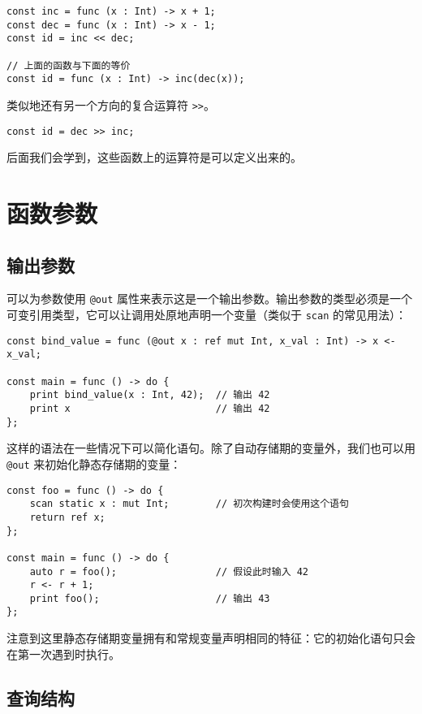 \begin{lstlisting}
const inc = func (x : Int) -> x + 1;
const dec = func (x : Int) -> x - 1;
const id = inc << dec;

// 上面的函数与下面的等价
const id = func (x : Int) -> inc(dec(x));
\end{lstlisting}

类似地还有另一个方向的复合运算符 \lstinline!>>!。

\begin{lstlisting}
const id = dec >> inc;
\end{lstlisting}

后面我们会学到，这些函数上的运算符是可以定义出来的。

\section{函数参数}

\subsection{输出参数}

可以为参数使用 \lstinline!@out! 属性来表示这是一个输出参数。输出参数的类型必须是一个可变引用类型，它可以让调用处原地声明一个变量（类似于 \lstinline!scan! 的常见用法）：

\begin{lstlisting}
const bind_value = func (@out x : ref mut Int, x_val : Int) -> x <- x_val;

const main = func () -> do {
	print bind_value(x : Int, 42);	// 输出 42
	print x							// 输出 42
};
\end{lstlisting}

这样的语法在一些情况下可以简化语句。除了自动存储期的变量外，我们也可以用 \lstinline!@out! 来初始化静态存储期的变量：

\begin{lstlisting}
const foo = func () -> do {
    scan static x : mut Int;		// 初次构建时会使用这个语句
    return ref x;
};

const main = func () -> do {
    auto r = foo();					// 假设此时输入 42
    r <- r + 1;
    print foo();					// 输出 43
};
\end{lstlisting}

注意到这里静态存储期变量拥有和常规变量声明相同的特征：它的初始化语句只会在第一次遇到时执行。

\subsection{查询结构}

